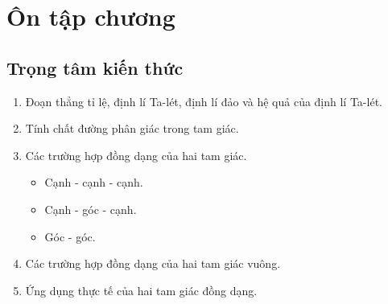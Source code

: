 \section{Ôn tập chương}
\subsection{Trọng tâm kiến thức}
\begin{enumerate}
	\item Đoạn thẳng tỉ lệ, định lí Ta-lét, định lí đảo và hệ quả của định lí Ta-lét.
	\item Tính chất đường phân giác trong tam giác.
	\item Các trường hợp đồng dạng của hai tam giác.
	\begin{itemize}
		\item Cạnh - cạnh - cạnh.
		\item Cạnh - góc - cạnh.
		\item Góc - góc.
	\end{itemize}
	\item Các trường hợp đồng dạng của hai tam giác vuông.
	\item Ứng dụng thực tế của hai tam giác đồng dạng.
\end{enumerate}


